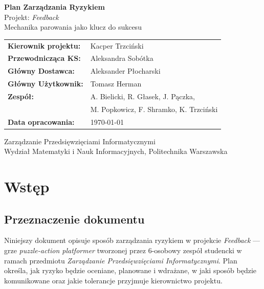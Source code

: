 \documentclass[11pt,a4paper]{article}
\newcommand{\docTitle}{Plan Zarządzania Ryzykiem}
\begin{document}
	\begin{titlepage}
		\centering
		\vspace*{2cm}
		{\LARGE\bfseries\color{accent} \docTitle}\\[0.5cm]
		{\large Projekt: \textit{Feedback}}\\[0.3cm]
		{\normalsize Mechanika parowania jako klucz do sukcesu}\\[2cm]
		
		\begin{tabular}{ll}
			\textbf{Kierownik projektu:}   & Kacper Trzciński \\[0.3em]
			\textbf{Przewodnicząca KS:}    & Aleksandra Sobótka \\[0.3em]
			\textbf{Główny Dostawca:}      & Aleksander Płocharski \\[0.3em]
			\textbf{Główny Użytkownik:}    & Tomasz Herman \\[0.3em]
			\textbf{Zespół:}               & A. Bielicki, R. Głasek, J. Pączka, \\
			& M. Popkowicz, F. Shramko, K. Trzciński \\[0.3em]
			\textbf{Data opracowania:}     & \today \\[0.3em]
		\end{tabular}
		
		\vfill
		{\small Zarządzanie Przedsięwzięciami Informatycznymi\\
			Wydział Matematyki i Nauk Informacyjnych, Politechnika Warszawska}
	\end{titlepage}
	
	
	\tableofcontents
	\newpage
	
	\section{Wstęp}\label{sec:wstep}
	
	\subsection{Przeznaczenie dokumentu}
	Niniejszy dokument opisuje sposób zarządzania ryzykiem w projekcie \textit{Feedback} ---
	grze \textit{puzzle-action platformer} tworzonej przez 6-osobowy zespół studencki w ramach
	przedmiotu \textit{Zarządzanie Przedsięwzięciami Informatycznymi}. Plan określa, jak ryzyko będzie
	oceniane, planowane i wdrażane, w jaki sposób będzie komunikowane oraz jakie tolerancje
	przyjmuje kierownictwo projektu.
	
\end{document}
